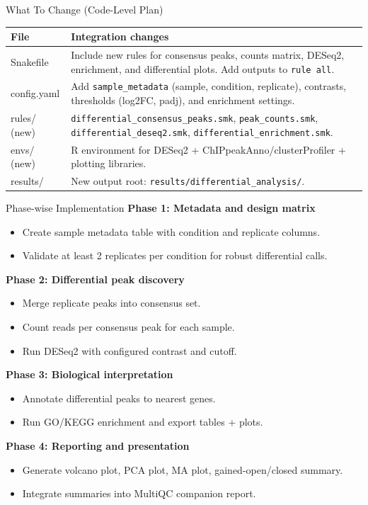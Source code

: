 \documentclass[aspectratio=169]{beamer}
\begin{document}
\begin{frame}{What To Change (Code-Level Plan)}
\footnotesize
\begin{tabularx}{\textwidth}{>{\RaggedRight\arraybackslash}p{} >{\RaggedRight\arraybackslash}X}
\toprule
\textbf{File} & \textbf{Integration changes} \\
\midrule
Snakefile & Include new rules for consensus peaks, counts matrix, DESeq2, enrichment, and differential plots. Add outputs to \texttt{rule all}. \\
config.yaml & Add \texttt{sample\_metadata} (sample, condition, replicate), contrasts, thresholds (log2FC, padj), and enrichment settings. \\
rules/ (new) & \texttt{differential\_consensus\_peaks.smk}, \texttt{peak\_counts.smk}, \texttt{differential\_deseq2.smk}, \texttt{differential\_enrichment.smk}. \\
envs/ (new) & R environment for DESeq2 + ChIPpeakAnno/clusterProfiler + plotting libraries. \\
results/ & New output root: \texttt{results/differential\_analysis/}. \\
\bottomrule
\end{tabularx}
\end{frame}

\begin{frame}{Phase-wise Implementation}
\textbf{Phase 1: Metadata and design matrix}
\begin{itemize}
  \item Create sample metadata table with condition and replicate columns.
  \item Validate at least 2 replicates per condition for robust differential calls.
\end{itemize}

\textbf{Phase 2: Differential peak discovery}
\begin{itemize}
  \item Merge replicate peaks into consensus set.
  \item Count reads per consensus peak for each sample.
  \item Run DESeq2 with configured contrast and cutoff.
\end{itemize}

\textbf{Phase 3: Biological interpretation}
\begin{itemize}
  \item Annotate differential peaks to nearest genes.
  \item Run GO/KEGG enrichment and export tables + plots.
\end{itemize}

\textbf{Phase 4: Reporting and presentation}
\begin{itemize}
  \item Generate volcano plot, PCA plot, MA plot, gained-open/closed summary.
  \item Integrate summaries into MultiQC companion report.
\end{itemize}
\end{frame}
\end{document}
